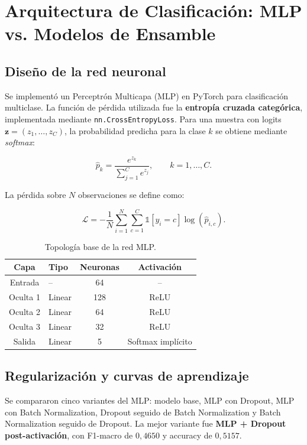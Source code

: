 \documentclass[10pt,a4paper]{article}
\begin{document}
\section{Arquitectura de Clasificaci\'on: MLP vs. Modelos de Ensamble}

\subsection{Dise\~no de la red neuronal}
Se implement\'o un Perceptr\'on Multicapa (MLP) en PyTorch para clasificaci\'on
multiclase. La funci\'on de p\'erdida utilizada fue la \textbf{entrop\'ia cruzada
categ\'orica}, implementada mediante \texttt{nn.CrossEntropyLoss}. Para una muestra
con logits $\mathbf{z} = (z_1,\dots,z_C)$, la probabilidad predicha para la clase
$k$ se obtiene mediante \textit{softmax}:

\begin{equation}
\hat{p}_k = \frac{e^{z_k}}{\sum_{j=1}^{C} e^{z_j}}, \qquad k = 1,\dots,C.
\end{equation}

La p\'erdida sobre $N$ observaciones se define como:

\begin{equation}
\mathcal{L} = - \frac{1}{N}\sum_{i=1}^{N}\sum_{c=1}^{C}
\mathbb{1}[y_i=c]\log(\hat{p}_{i,c}).
\end{equation}

\begin{table}[H]
\centering
\caption{Topolog\'ia base de la red MLP.}
\label{tab:topo}
\small
\begin{tabular}{clcc}
\toprule
Capa & Tipo & Neuronas & Activaci\'on \\
\midrule
Entrada & --     & 64  & -- \\
Oculta 1 & Linear & 128 & ReLU \\
Oculta 2 & Linear & 64  & ReLU \\
Oculta 3 & Linear & 32  & ReLU \\
Salida   & Linear & 5   & Softmax impl\'icito \\
\bottomrule
\end{tabular}
\end{table}

\subsection{Regularizaci\'on y curvas de aprendizaje}
Se compararon cinco variantes del MLP: modelo base, MLP con Dropout, MLP con
Batch Normalization, Dropout seguido de Batch Normalization y Batch Normalization
seguido de Dropout. La mejor variante fue \textbf{MLP + Dropout post-activaci\'on},
con F1-macro de $0{,}4650$ y accuracy de $0{,}5157$.
\end{document}
